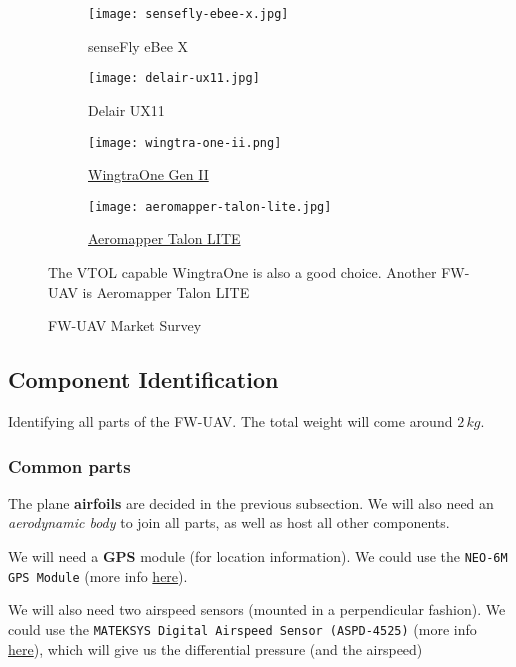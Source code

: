 \begin{figure}[ht]
    \centering
    \begin{subfigure}[b]{0.45\textwidth}
        \texttt{[image: sensefly-ebee-x.jpg]}
        \caption{senseFly eBee X}
        \label{fig:ms-sf-ebee-x}
    \end{subfigure}
    \begin{subfigure}[b]{0.45\textwidth}
        \texttt{[image: delair-ux11.jpg]}
        \caption{Delair UX11}
        \label{fig:ms-delair-ux11}
    \end{subfigure}
    \begin{subfigure}[b]{0.45\textwidth}
        \texttt{[image: wingtra-one-ii.png]}
        \caption{\href{https://wingtra.com/mapping-drone-wingtraone/}{WingtraOne Gen II}}
    \end{subfigure}
    \begin{subfigure}[b]{0.45\textwidth}
        \texttt{[image: aeromapper-talon-lite.jpg]}
        \caption{\href{https://www.aeromao.com/aeromapper-talon-lite/}{Aeromapper Talon LITE}}
    \end{subfigure}
    \caption{FW-UAV Market Survey}
    \label{fig:market-survey-fwuavs}
    The VTOL capable WingtraOne is also a good choice. Another FW-UAV is Aeromapper Talon LITE
\end{figure}



\subsection{Component Identification}

Identifying all parts of the FW-UAV. The total weight will come around $2\,kg$.

\subsubsection*{Common parts}

The plane \textbf{airfoils} are decided in the previous subsection. We will also need an \emph{aerodynamic body} to join all parts, as well as host all other components.

We will need a \textbf{GPS} module (for location information). We could use the \texttt{NEO-6M GPS Module} (more info \href{https://www.electroschematics.com/neo-6m-gps-module/}{here}).

We will also need two airspeed sensors (mounted in a perpendicular fashion). We could use the \texttt{MATEKSYS Digital Airspeed Sensor (ASPD-4525)} (more info \href{http://www.mateksys.com/?portfolio=aspd-4525}{here}), which will give us the differential pressure (and the airspeed)

